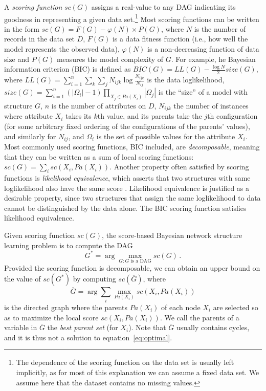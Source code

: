 A \emph{scoring function} ${sc}(G)$ assigns a real-value to any DAG indicating its goodness in representing a given data set.\footnote{The dependence of the scoring function on the data set is usually left implicitly, as for most of this explanation we can assume a fixed data set. We assume here that the dataset contains no missing values.} Most scoring functions can be written in the form
$  {sc}( G ) = F( G ) - \varphi( N ) \times P( G ) $,
where $N$ is the number of records in the data set $D$, $F( G )$ is a data fitness function (i.e., how well the model represents the observed data), $\varphi( N )$ is a non-decreasing function of data size and $P( G )$ measures the model complexity of $G$. For example, he Bayesian information criterion (BIC) is defined as ${BIC}( G ) = {LL}( G ) - \frac{\log N}{2} {size}( G )$, where ${LL}( G ) = \sum_{i=1}^{n} \sum_{k} \sum_{j} N_{ijk} \log \frac{N_{ijk}}{N_{ij}}$ is the data loglikelihood, ${size}( G ) = \sum_{i=1}^{n} ( |\Omega_i| - 1 ) \prod_{X_j \in {Pa}( X_i )} |\Omega_j|$ is the ``size'' of a model with structure $G$, $n$ is the number of attributes on $D$, $N_{ijk}$ the number of instances where attribute $X_i$ takes its $k$th value, and its parents take the $j$th configuration (for some arbitrary fixed ordering of the configurations of the parents' values), and similarly  for $N_{ij}$, and $\Omega_i$ is the set of possible values for the attribute $X_i$.
Most commonly used scoring functions, BIC included, are \emph{decomposable}, meaning that they can be written as a sum of local scoring functions: ${sc}(G)=\sum_i {sc}(X_i, {Pa}(X_i))$. Another property often satisfied by scoring functions is \emph{likelihood equivalence}, which asserts that two structures with same loglikelihood also have the same score \cite{Maxwell04}. Likelihood equivalence is justified as a desirable property, since two structures that assign the same loglikelihood to data cannot be distinguished by the data alone. The BIC scoring function satisfies likelihood equivalence.

Given scoring function ${sc}(G)$, the score-based Bayesian network structure learning problem is to compute the DAG
\begin{equation}
  \label{eq:optimal}
  G^* = \arg\max_{G: G \text{ is a DAG}} {sc}( G ) \, .
\end{equation}
Provided the scoring function is decomposable, we can obtain an upper bound on the value of $sc(G^*)$ by computing $sc(\overline{G})$, where
\begin{equation}
  \label{eq:bestparents}
  \overline{G} = \arg \sum_i \max_{{Pa}(X_i)} sc( X_i, {Pa}( X_i ) ) 
\end{equation}
is the directed graph where the parents ${Pa}( X_i )$ of each node $X_i$ are selected so as to maximize the local score ${sc}( X_i , {Pa}( X_i ) )$. We call the parents of a variable in $\overline{G}$ the \emph{best parent set} (for $X_i$). Note that $\overline{G}$ usually contains cycles, and it is thus not a solution to equation~\ref{eq:optimal}.

